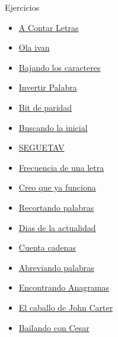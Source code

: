 \documentclass[12pt]{beamer}
\begin{document}
\begin{frame}{Ejercicios}
    \footnotesize\begin{multicols}{2}
        \begin{itemize}
            \item \href{https://omegaup.com/arena/problem/A-Contar-Letras/}{A Contar Letras}
            \item \href{https://omegaup.com/arena/problem/Ola-ivan/}{Ola ivan}
            \item \href{https://omegaup.com/arena/problem/Bajando-los-caracteres/}{Bajando los caracteres}
            \item \href{https://omegaup.com/arena/problem/Invertir-Palabra/}{Invertir Palabra}
            \item \href{https://omegaup.com/arena/problem/BIT_DE_PARIDAD/}{Bit de paridad}
            \item \href{https://omegaup.com/arena/problem/Buscando-la-inicial/}{Buscando la inicial}
            \item \href{https://omegaup.com/arena/problem/SEGUETAV/}{SEGUETAV}
            \item \href{https://omegaup.com/arena/problem/Frecuencia-de-una-letra/}{Frecuencia de una letra}
            \item \href{https://omegaup.com/arena/problem/Creo-que-ya-funciona/}{Creo que ya funciona}
            \item \href{https://omegaup.com/arena/problem/Recortando-palabras/}{Recortando palabras}
            \item \href{https://omegaup.com/arena/problem/Dias-de-la-actualidad/}{Dias de la actualidad}
            \item \href{https://omegaup.com/arena/problem/Cuenta-Cadenas/}{Cuenta cadenas}
            \item \href{https://omegaup.com/arena/problem/Abreviando-palabras/}{Abreviando palabras}
            \item \href{https://omegaup.com/arena/problem/Encontrando-Anagramas/}{Encontrando Anagramas}
            \item \href{https://omegaup.com/arena/problem/El-caballo-de-John-Carter/}{El caballo de John Carter}
            \item \href{https://omegaup.com/arena/problem/Bailando-con-Cesar/}{Bailando con Cesar}
        \end{itemize}
    \end{multicols}
\end{frame}
\end{document}
